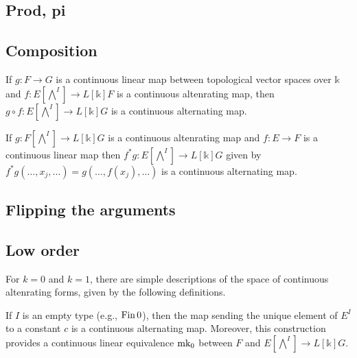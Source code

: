 \subsection{Prod, pi}%
\label{sec:prod-pi}


\subsection{Composition}%
\label{sec:composition}

\begin{theorem}%
  \label{thm:clm-comp}
  If \(g\colon F \to G\) is a continuous linear map between topological vector spaces over \(\mathbb k\)
  and \(f\colon E [\bigwedge^{I}]\to L[\mathbb k] F\) is a continuous altenrating map,
  then \(g \circ f\colon E [\bigwedge^{I}]\to L[\mathbb k] G\) is a continuous alternating map.
\end{theorem}

\begin{theorem}%
  \label{thm:comp-clm}
  If \(g\colon F [\bigwedge^{I}]\to L[\mathbb k] G\) is a continuous altenrating map
  and \(f\colon E \to F\) is a continuous linear map
  then \(f^{*}g \colon E [\bigwedge^{I}]\to L[\mathbb k] G\) given by \(f^{*}g(\dots, x_{j}, \dots) = g (\dots, f(x_{j}), \dots)\) is a continuous alternating map.
\end{theorem}

\subsection{Flipping the arguments}%
\label{sec:flipping-arguments}


\subsection{Low order}%
\label{sec:low-order}

For \(k = 0\) and \(k = 1\), there are simple descriptions of the space of continuous altenrating forms,
given by the following definitions.

\begin{definition}
  If \(I\) is an empty type (e.g., \(\operatorname{Fin} 0\)),
  then the map sending the unique element of \(E^{I}\) to a constant \(c\)
  is a continuous alternating map.
  Moreover, this construction provides a continuous linear equivalence \(\operatorname{mk_0}\)
  between \(F\) and \(E [\bigwedge^{I}]\to L[\mathbb k] G\).
\end{definition}

